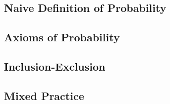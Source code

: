 \subsection{Naive Definition of Probability}

\begin{tcolorbox}[title=Problem 23, breakable]
\end{tcolorbox}

\begin{tcolorbox}[title=Problem 26, breakable]
\end{tcolorbox}

\begin{tcolorbox}[title=Problem 31, breakable]
\end{tcolorbox}

\begin{tcolorbox}[title=Problem 40, breakable]
\end{tcolorbox}

\subsection{Axioms of Probability}

\begin{tcolorbox}[title=Problem 43, breakable]
\end{tcolorbox}

\begin{tcolorbox}[title=Problem 44, breakable]
\end{tcolorbox}

\begin{tcolorbox}[title=Problem 48, breakable]
\end{tcolorbox}

\subsection{Inclusion-Exclusion}

\begin{tcolorbox}[title=Problem 49, breakable]
\end{tcolorbox}

\subsection{Mixed Practice}

\begin{tcolorbox}[title=Problem 57, breakable]
\end{tcolorbox}

\begin{tcolorbox}[title=Problem 60, breakable]
\end{tcolorbox}

\begin{tcolorbox}[title=Problem 61, breakable]
\end{tcolorbox}

\begin{tcolorbox}[title=Problem 62, breakable]
\end{tcolorbox}